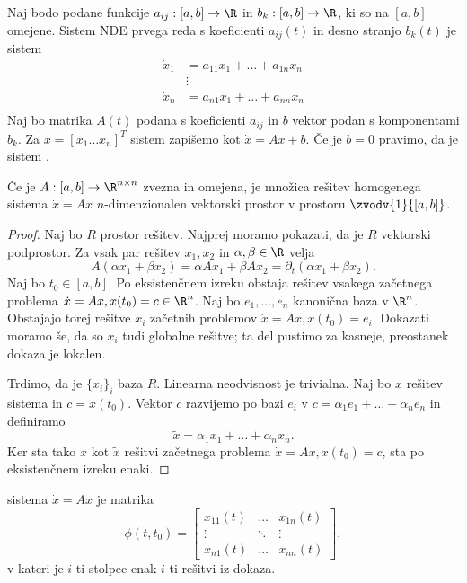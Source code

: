 
Naj bodo podane funkcije $a_{ij} : [a,b] \to \R$ in $b_k: [a,b] \to \R$, ki so
na $[a,b]$ omejene.
Sistem NDE prvega reda s koeficienti $a_{ij}(t)$ in desno stranjo $b_k(t)$ je
sistem
\begin{align*}
  \dot{x}_1 &= a_{11} x_1 + \ldots + a_{1n} x_n \\
   & \vdots \\
  \dot{x}_n &= a_{n1} x_1 + \ldots + a_{nn} x_n \\
\end{align*}
Naj bo matrika $A(t)$ podana s koeficienti $a_{ij}$ in $b$ vektor podan s
komponentami $b_k$.
Za $x = [x_1 \ldots x_n]^T$ sistem zapišemo kot $\dot{x} = Ax + b$.
Če je $b = 0$ pravimo, da je sistem .

\begin{izrek}
  Če je $A:[a,b] \to \R^{n \times n}$ zvezna in omejena, je množica rešitev
  homogenega sistema $\dot{x} = Ax$ $n$-dimenzionalen vektorski prostor v
  prostoru $\zvodv{1}{[a,b]}$.
\end{izrek}

\begin{proof}
  Naj bo $R$ prostor rešitev.
  Najprej moramo pokazati, da je $R$ vektorski podprostor.
  Za vsak par rešitev $x_1, x_2$ in $\alpha, \beta \in \R$ velja
  \[
	A(\alpha x_1 + \beta x_2) = \alpha A x_1 + \beta A x_2 = \partial_t (\alpha
	x_1 + \beta x_2).
  \]
  Naj bo $t_0 \in [a,b]$.
  Po eksistenčnem izreku obstaja rešitev vsakega začetnega problema $\dot{x} =
  Ax, x(t_0) = c \in \R^n$.
  Naj bo $e_1, \ldots, e_n$ kanonična baza v $\R^n$.
  Obstajajo torej rešitve $x_i$ začetnih problemov $\dot{x} = Ax, x(t_0) = e_i$.
  Dokazati moramo še, da so $x_i$ tudi globalne rešitve; ta del pustimo za
  kasneje, preostanek dokaza je lokalen.

  Trdimo, da je $\{x_i\}_i$ baza $R$.
  Linearna neodvisnost je trivialna.
  Naj bo $x$ rešitev sistema in $c = x(t_0)$.
  Vektor $c$ razvijemo po bazi $e_i$ v $c = \alpha_1 e_1 + \ldots + \alpha_n
  e_n$ in definiramo
  \[
	\tilde{x} = \alpha_1 x_1 + \ldots + \alpha_n x_n.
  \]
  Ker sta tako $x$ kot $\tilde{x}$ rešitvi začetnega problema $\dot{x} = Ax,
  x(t_0) = c$, sta po eksistenčnem izreku enaki.
\end{proof}


\begin{definicija}
   sistema $\dot{x} = Ax$ je matrika
  \[
	\phi(t,t_0)
	=
	\begin{bmatrix}
	  x_{11}(t) & \ldots & x_{1n}(t) \\
	  \vdots & \ddots & \vdots \\
	  x_{n1}(t) & \ldots & x_{nn}(t)
	\end{bmatrix},
  \]
  v kateri je $i$-ti stolpec enak $i$-ti rešitvi iz dokaza.
\end{definicija}

